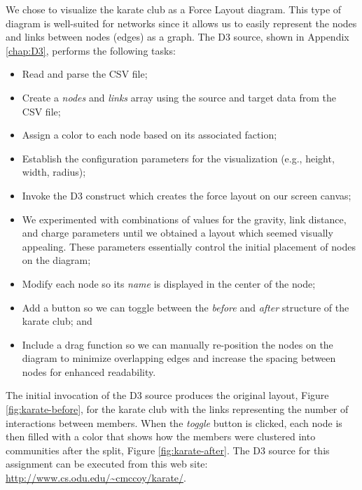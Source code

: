 \documentclass[letterpaper,11pt]{report}
\begin{document}
\begin{savenotes}
We chose to visualize the karate club as a Force Layout diagram. This type of diagram is well-suited for networks since it allows us to easily represent the nodes and links between nodes (edges) as a graph. The D3 source, shown in Appendix \ref{chap:D3}, performs the following tasks:
\begin{itemize}
\item Read and parse the CSV file;
\item Create a \emph{nodes} and \emph{links} array using the source and target data from the CSV file;
\item Assign a color to each node based on its associated faction;
\item Establish the configuration parameters for the visualization (e.g., height, width, radius); 
\item Invoke the D3 construct which creates the force layout on our screen canvas;
\item We experimented with combinations of values for the gravity, link distance, and charge parameters until we obtained a layout which seemed visually appealing. These parameters essentially control the initial placement of nodes on the diagram;
\item Modify each node so its \emph{name} is displayed in the center of the node;
\item Add a button so we can toggle between the \emph{before} and \emph{after} structure of the karate club; and
\item Include a drag function so we can manually re-position the nodes on the diagram to minimize overlapping edges and increase the spacing between nodes for enhanced readability.
\end{itemize}



\indent{}The initial invocation of the D3 source produces the original layout, Figure \ref{fig:karate-before}, for the karate club with the links representing the number of interactions between members. When the \emph{toggle} button is clicked, each node is then filled with a color that shows how the members were clustered into communities after the split, Figure \ref{fig:karate-after}. The D3 source for this assignment can be executed from this web site: \url{http://www.cs.odu.edu/~cmccoy/karate/}.


\end{savenotes}
\end{document}
